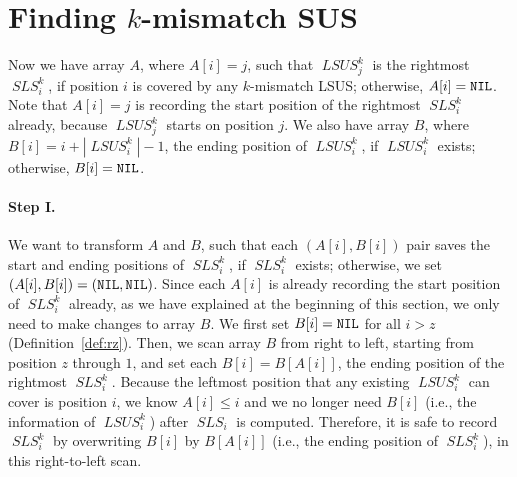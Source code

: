 \documentclass[11pt]{llncs}
\newcommand{\remove}[1]{}
\DeclareMathOperator{\lsus}{\mathit{LSUS}}
\DeclareMathOperator{\sls}{\mathit{SLS}}
\begin{document}
\section{Finding $k$-mismatch SUS}
\label{sec:sus}
Now we have array $A$, where $A[i]=j$, such that $\lsus_j^k$ is the
rightmost $\sls_i^k$, if position $i$ is covered by any
$k$-mismatch LSUS; otherwise, $A[i] = {\tt NIL}$. Note that $A[i] = j$
is recording the start position of the rightmost $\sls_i^k$ already,
because $\lsus_j^k$ starts on position $j$.  We also have array $B$,
where $B[i] = i+|\lsus_i^k|-1$, the ending position of $\lsus_i^k$, if
$\lsus_i^k$ exists; otherwise, $B[i]={\tt NIL}$.

\remove{
Recall that it is possible that some positions may not be covered by
any $k$-mismatch LSUS (see the example after
Definition~\ref{def:lsus}). Due to Lemma~\ref{lem:exist}
and~\ref{lem:lsus2}, we know such positions must comprise a continuous
chunk on the right end of string $S$. Let $z$, $1\leq z\leq n$, denote
the rightmost position that is covered by at least one $k$-mismatch
LSUS, i.e., $A[z]$ is the rightmost non-NIL element in array
$A$. Again, due to Lemma~\ref{lem:exist} and~\ref{lem:lsus2}, it is
trivial to find the value of $z$ in $O(n)$ time: scan
array $B$ from right toward left, and stop when meeting the first
non-NIL $B$ array element, say $B[\delta]$, then $z = \delta +
B[\delta] -1$.
}


\paragraph{Step I.} We want to transform $A$ and $B$, such that each
$(A[i],B[i])$ pair saves the start and ending positions of $\sls_i^k$,
if $\sls_i^k$ exists; otherwise, we set $(A[i],B[i]) = ({\tt
  NIL,NIL})$.  Since each $A[i]$ is already recording the start
position of $\sls_i^k$ already, as we have explained at the beginning
of this section, we only need to make changes to array $B$.  We first
set $B[i]={\tt NIL}$ for all $i>z$ (Definition~\ref{def:rz}). Then, we
scan array $B$ from right to left, starting from position $z$ through
$1$, and set each $B[i] = B[A[i]]$, the ending position of the
rightmost $\sls_i^k$. Because the leftmost position that any existing
$\lsus_i^k$ can cover is position $i$, we know $A[i]\leq i$ and we no
longer need $B[i]$ (i.e., the information of $\lsus_i^k$) after
$\sls_i$ is computed. Therefore, it is safe to record $\sls_i^k$ by
overwriting $B[i]$ by $B[A[i]]$ (i.e., the ending position of
$\sls_i^k$), in this right-to-left scan.
\end{document}
